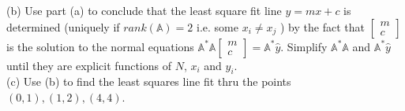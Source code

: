 \documentclass[12 pt]{article}
\begin{document}
\noindent
(b) Use part (a) to conclude that the least square fit line $y=mx+c$ is determined (uniquely if $rank(\mathbb{A})=2$ i.e. some $x_i \neq x_j$ ) by the fact that $\begin{bmatrix} m \\ c \end{bmatrix}$ 
is the solution to the normal equations $\mathbb{A}^* \mathbb{A} \begin{bmatrix} m \\ c \end{bmatrix} =\mathbb{A}^* \hat{y}$. Simplify $\mathbb{A}^*\mathbb{A}$ and 
$\mathbb{A}^* \hat{y}$ until they are explicit functions of $N$, $x_i$ and $y_i$. \\

\noindent
(c) Use (b) to find the least squares line fit thru the points $(0,1), (1,2), (4,4)$.
\end{document}
